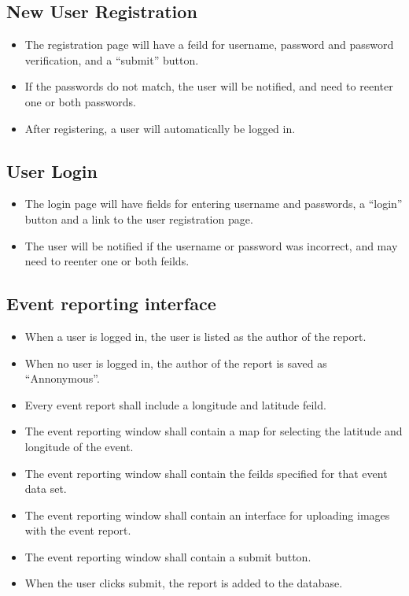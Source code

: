 \subsection{New User Registration}
\begin{itemize}
\item The registration page will have a feild for username, password and password verification, and a ``submit'' button.
\item If the passwords do not match, the user will be notified, and need to reenter one or both passwords.
\item After registering, a user will automatically be logged in.
\end{itemize}

\subsection{User Login}
\begin{itemize}
\item The login page will have fields for entering username and passwords, a ``login'' button and a link to the user registration page.
\item The user will be notified if the username or password was incorrect, and may need to reenter one or both feilds.
\end{itemize}

\subsection{Event reporting interface}
\begin{itemize}
\item When a user is logged in, the user is listed as the author of the report.
\item When no user is logged in, the author of the report is saved as ``Annonymous''.
\item Every event report shall include a longitude and latitude feild.
\item The event reporting window shall contain a map for selecting the latitude and longitude of the event.
\item The event reporting window shall contain the feilds specified for that event data set.
\item The event reporting window shall contain an interface for uploading images with the event report.
\item The event reporting window shall contain a submit button.
\item When the user clicks submit, the report is added to the database.
\end{itemize}

